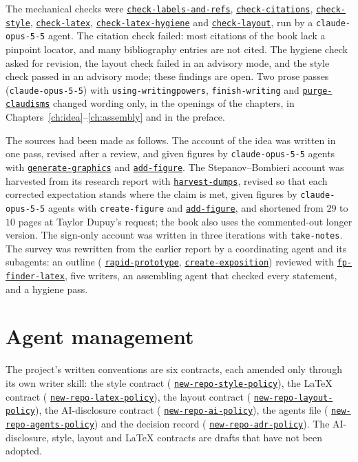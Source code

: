 \documentclass[11pt]{amsbook}
\theoremstyle{plain}
\theoremstyle{definition}
\theoremstyle{remark}
\numberwithin{equation}{section}
\numberwithin{figure}{chapter}
\numberwithin{table}{chapter}
\newcommand{\vtwoskillurl}{https://github.com/tdupu/%
agent-skills-public/blob/8d13efb5e66306aeae6e3b948bc463e7e2db1b65}
\newcommand{\vtwoskill}[1]{%
\href{\vtwoskillurl/skills/#1/SKILL.md}{\texttt{#1}}}
\begin{document}
The mechanical checks were \vtwoskill{check-labels-and-refs},
\vtwoskill{check-citations}, \vtwoskill{check-style},
\vtwoskill{check-latex}, \vtwoskill{check-latex-hygiene} and
\vtwoskill{check-layout}, run by a \texttt{claude-opus-5-5} agent. The
citation check failed: most citations of the book lack a pinpoint
locator, and many bibliography entries are not cited. The hygiene check
asked for revision, the layout check failed in an advisory mode, and the
style check passed in an advisory mode; these findings are open.
Two prose passes (\texttt{claude-opus-5-5}) with
\texttt{using-writingpowers}, \texttt{finish-writing} and
\vtwoskill{purge-claudisms} changed wording only, in the openings of
the chapters, in Chapters~\ref{ch:idea}--\ref{ch:assembly} and in the
preface.

The sources had been made as follows. The account of the idea was
written in one pass, revised after a review, and given figures by
\texttt{claude-opus-5-5} agents with \vtwoskill{generate-graphics} and
\vtwoskill{add-figure}. The Stepanov--Bombieri account was harvested
from its research report with \vtwoskill{harvest-dumps}, revised so
that each corrected expectation stands where the claim is met,
given figures by \texttt{claude-opus-5-5} agents with
\texttt{create-figure} and \vtwoskill{add-figure}, and shortened from
$29$ to $10$ pages at Taylor Dupuy's request; the book also uses the
commented-out longer version. The sign-only account was written in
three iterations with \texttt{take-notes}. The survey was rewritten
from the earlier report by a coordinating agent and its subagents: an
outline (\vtwoskill{rapid-prototype}, \vtwoskill{create-exposition})
reviewed with \vtwoskill{fp-finder-latex}, five writers, an assembling
agent that checked every statement, and a hygiene pass.

\section{Agent management}
\label{sec:ai-agents}
The project's written conventions are six contracts, each amended
only through its own writer skill: the style contract
(\vtwoskill{new-repo-style-policy}), the \LaTeX{} contract
(\vtwoskill{new-repo-latex-policy}), the layout contract
(\vtwoskill{new-repo-layout-policy}), the AI-disclosure contract
(\vtwoskill{new-repo-ai-policy}), the agents file
(\vtwoskill{new-repo-agents-policy}) and the decision record
(\vtwoskill{new-repo-adr-policy}). The AI-disclosure, style, layout and
\LaTeX{} contracts are drafts that have not been adopted.
\end{document}
